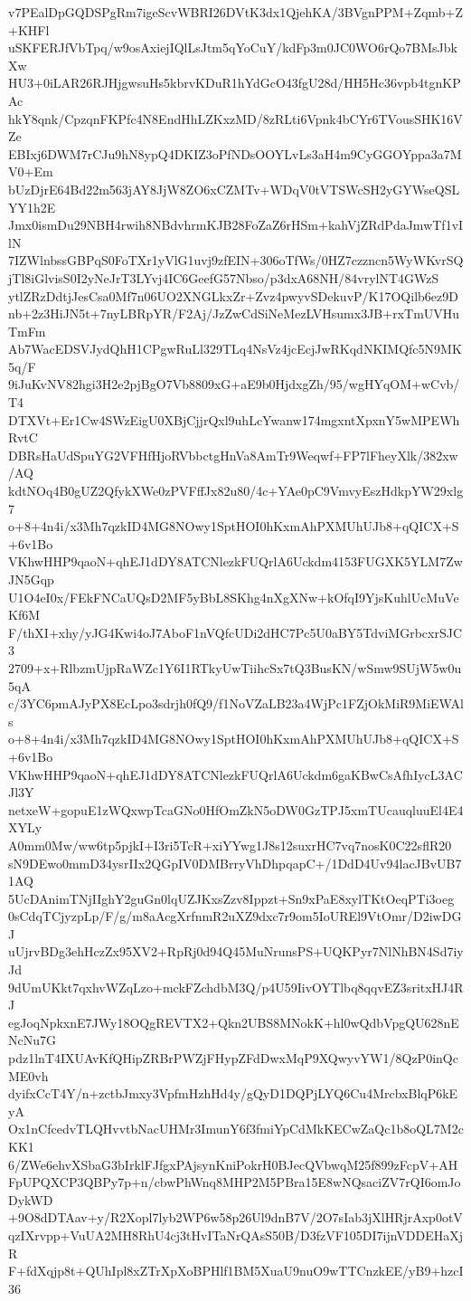 v7PEalDpGQDSPgRm7igeScvWBRI26DVtK3dx1QjehKA/3BVgnPPM+Zqmb+Z+KHFl
uSKFERJfVbTpq/w9osAxiejIQlLsJtm5qYoCuY/kdFp3m0JC0WO6rQo7BMsJbkXw
HU3+0iLAR26RJHjgwsuHs5kbrvKDuR1hYdGcO43fgU28d/HH5Hc36vpb4tgnKPAc
hkY8qnk/CpzqnFKPfc4N8EndHhLZKxzMD/8zRLti6Vpnk4bCYr6TVousSHK16VZe
EBIxj6DWM7rCJu9hN8ypQ4DKIZ3oPfNDsOOYLvLs3aH4m9CyGGOYppa3a7MV0+Em
bUzDjrE64Bd22m563jAY8JjW8ZO6xCZMTv+WDqV0tVTSWcSH2yGYWseQSLYY1h2E
Jmx0ismDu29NBH4rwih8NBdvhrmKJB28FoZaZ6rHSm+kahVjZRdPdaJmwTf1vIlN
7IZWlnbssGBPqS0FoTXr1yVlG1uvj9zfEIN+306oTfWs/0HZ7czzncn5WyWKvrSQ
jTl8iGlvisS0I2yNeJrT3LYvj4IC6GeefG57Nbso/p3dxA68NH/84vrylNT4GWzS
ytlZRzDdtjJesCsa0Mf7n06UO2XNGLkxZr+Zvz4pwyvSDekuvP/K17OQilb6ez9D
nb+2z3HiJN5t+7nyLBRpYR/F2Aj/JzZwCdSiNeMezLVHsumx3JB+rxTmUVHuTmFm
Ab7WacEDSVJydQhH1CPgwRuLl329TLq4NsVz4jcEcjJwRKqdNKIMQfc5N9MK5q/F
9iJuKvNV82hgi3H2e2pjBgO7Vb8809xG+aE9b0HjdxgZh/95/wgHYqOM+wCvb/T4
DTXVt+Er1Cw4SWzEigU0XBjCjjrQxl9uhLcYwanw174mgxntXpxnY5wMPEWhRvtC
DBRsHaUdSpuYG2VFHfHjoRVbbctgHnVa8AmTr9Weqwf+FP7lFheyXlk/382xw/AQ
kdtNOq4B0gUZ2QfykXWe0zPVFffJx82u80/4c+YAe0pC9VmvyEszHdkpYW29xlg7
o+8+4n4i/x3Mh7qzkID4MG8NOwy1SptHOI0hKxmAhPXMUhUJb8+qQICX+S+6v1Bo
VKhwHHP9qaoN+qhEJ1dDY8ATCNlezkFUQrlA6Uckdm4153FUGXK5YLM7ZwJN5Gqp
U1O4eI0x/FEkFNCaUQsD2MF5yBbL8SKhg4nXgXNw+kOfqI9YjsKuhlUcMuVeKf6M
F/thXI+xhy/yJG4Kwi4oJ7AboF1nVQfcUDi2dHC7Pc5U0aBY5TdviMGrbcxrSJC3
2709+x+RlbzmUjpRaWZc1Y6I1RTkyUwTiihcSx7tQ3BusKN/wSmw9SUjW5w0u5qA
c/3YC6pmAJyPX8EcLpo3sdrjh0fQ9/f1NoVZaLB23a4WjPc1FZjOkMiR9MiEWAls
o+8+4n4i/x3Mh7qzkID4MG8NOwy1SptHOI0hKxmAhPXMUhUJb8+qQICX+S+6v1Bo
VKhwHHP9qaoN+qhEJ1dDY8ATCNlezkFUQrlA6Uckdm6gaKBwCsAfhIycL3ACJl3Y
netxeW+gopuE1zWQxwpTcaGNo0HfOmZkN5oDW0GzTPJ5xmTUcauqluuEl4E4XYLy
A0mm0Mw/ww6tp5pjkI+I3ri5TcR+xiYYwg1J8s12suxrHC7vq7nosK0C22sflR20
sN9DEwo0mmD34ysrIIx2QGpIV0DMBrryVhDhpqapC+/1DdD4Uv94lacJBvUB71AQ
5UcDAnimTNjIIghY2guGn0lqUZJKxsZzv8Ippzt+Sn9xPaE8xylTKtOeqPTi3oeg
0sCdqTCjyzpLp/F/g/m8aAcgXrfnmR2uXZ9dxc7r9om5IoUREl9VtOmr/D2iwDGJ
uUjrvBDg3ehHczZx95XV2+RpRj0d94Q45MuNrunsPS+UQKPyr7NlNhBN4Sd7iyJd
9dUmUKkt7qxhvWZqLzo+mckFZchdbM3Q/p4U59IivOYTlbq8qqvEZ3sritxHJ4RJ
egJoqNpkxnE7JWy18OQgREVTX2+Qkn2UBS8MNokK+hl0wQdbVpgQU628nENcNu7G
pdz1lnT4IXUAvKfQHipZRBrPWZjFHypZFdDwxMqP9XQwyvYW1/8QzP0inQcME0vh
dyifxCcT4Y/n+zctbJmxy3VpfmHzhHd4y/gQyD1DQPjLYQ6Cu4MrcbxBlqP6kEyA
Ox1nCfcedvTLQHvvtbNacUHMr3ImunY6f3fmiYpCdMkKECwZaQc1b8oQL7M2cKK1
6/ZWe6ehvXSbaG3bIrklFJfgxPAjsynKniPokrH0BJecQVbwqM25f899zFcpV+AH
FpUPQXCP3QBPy7p+n/cbwPhWnq8MHP2M5PBra15E8wNQsaciZV7rQI6omJoDykWD
+9O8dDTAav+y/R2Xopl7lyb2WP6w58p26Ul9dnB7V/2O7sIab3jXlHRjrAxp0otV
qzIXrvpp+VuUA2MH8RhU4cj3tHvITaNrQAsS50B/D3fzVF105DI7ijnVDDEHaXjR
F+fdXqjp8t+QUhIpl8xZTrXpXoBPHlf1BM5XuaU9nuO9wTTCnzkEE/yB9+hzcI36

